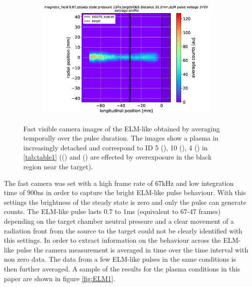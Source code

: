 \begin{figure}
\begin{subfigure}{0.31\textwidth}
         \vspace*{-17mm}
         {\color{white}\caption{\phantom{wewwwww}}\label{fig:ELMb}}
     \end{subfigure}
     \hfill
     \begin{subfigure}{0.31\textwidth}
         \centering
         \vspace*{-0mm}
         \includegraphics[width=\textwidth,trim={34 0 8 8},clip]{Chapters/chapter3/figs/fast_camera_merge_97_average3.png}
         \vspace*{-17mm}
         {\color{white}\caption{\phantom{wewwwww}}\label{fig:ELMc}}
     \end{subfigure}
        \vspace*{+6mm}
        \caption{Fast visible camera images of the ELM-like obtained by averaging temporally over the pulse duration. The images show a plasma in increasingly detached and correspond to ID 5 (), 10 (), 4 () in \autoref{tab:table1} (() and () are effected by overexposure in the black region near the target).}
        \label{fig:ELM1}
\end{figure}

The fast camera was set with a high frame rate of 67kHz and low integration time of 900ns in order to capture the bright ELM-like pulse behaviour. With this settings the brightness of the steady state is zero and only the pulse can generate counts. The ELM-like pulse lasts 0.7 to 1ms (equivalent to 67-47 frames) depending on the target chamber neutral pressure and a clear movement of a radiation front from the source to the target could not be clearly identified with this settings. In order to extract information on the behaviour across the ELM-like pulse the camera measurement is averaged in time over the time interval with non zero data. The data from a few ELM-like pulses in the same conditions is then further averaged. A sample of the results for the plasma conditions in this paper are shown in figure \autoref{fig:ELM1}.

